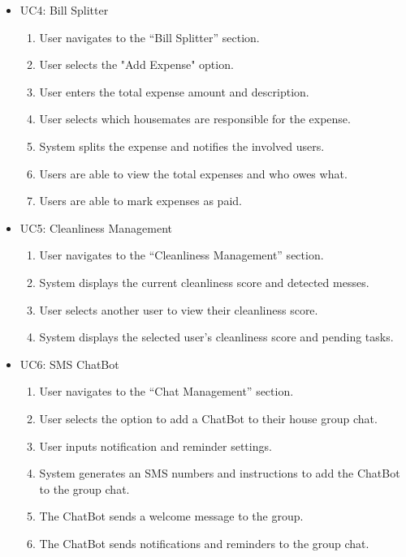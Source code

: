 \documentclass{scrreprt}
\theoremstyle{definition}
\begin{document}
\begin{itemize}
    \item UC4: Bill Splitter
    \begin{enumerate}
        \item User navigates to the “Bill Splitter” section.
        \item User selects the "Add Expense" option.
        \item User enters the total expense amount and description.
        \item User selects which housemates are responsible for the expense.
        \item System splits the expense and notifies the involved users.
        \item Users are able to view the total expenses and who owes what.
        \item Users are able to mark expenses as paid.
    \end{enumerate}
    
    \item UC5: Cleanliness Management
    \begin{enumerate}
        \item User navigates to the “Cleanliness Management” section.
        \item System displays the current cleanliness score and detected messes.
        \item User selects another user to view their cleanliness score.
        \item System displays the selected user’s cleanliness score and pending tasks.
    \end{enumerate}
    
    \item UC6: SMS ChatBot
    \begin{enumerate}
        \item User navigates to the “Chat Management” section.
        \item User selects the option to add a ChatBot to their house group chat.
        \item User inputs notification and reminder settings.
        \item System generates an SMS numbers and instructions to add the ChatBot to the group chat.
        \item The ChatBot sends a welcome message to the group.
        \item The ChatBot sends notifications and reminders to the group chat.
    \end{enumerate}
    
\end{itemize}
    
\end{document}
